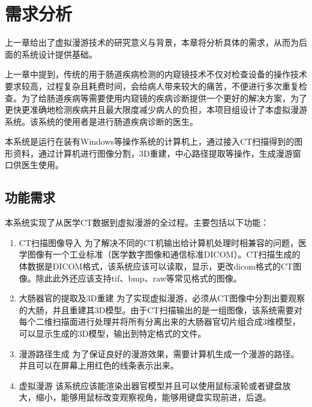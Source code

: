 \chapter{需求分析}
上一章给出了虚拟漫游技术的研究意义与背景，本章将分析具体的需求，从而为后面的系统设计提供基础。

上一章中提到，传统的用于肠道疾病检测的内窥镜技术不仅对检查设备的操作技术要求较高，过程复杂且耗费时间，会给病人带来较大的痛苦，不便进行多次重复检查。为了给肠道疾病等需要使用内窥镜的疾病诊断提供一个更好的解决方案，为了更快更准确地检测疾病并且最大限度减少病人的负担，本项目组设计了本虚拟漫游系统。该系统的使用者是进行肠道疾病诊断的医生。

本系统是运行在装有Windows等操作系统的计算机上，通过接入CT扫描得到的图形资料，通过计算机进行图像分割，3D重建，中心路径提取等操作，生成漫游窗口供医生使用。
\section{功能需求}
本系统实现了从医学CT数据到虚拟漫游的全过程。主要包括以下功能：
\begin{enumerate}
    \item CT扫描图像导入
为了解决不同的CT机输出给计算机处理时相兼容的问题，医学图像有一个工业标准（医学数字图像和通信标准DICOM）。CT扫描生成的体数据是DICOM格式，该系统应该可以读取，显示，更改dicom格式的CT图像。除此此外还应该支持tif、bmp、raw等常见格式的图像。
    \item 大肠器官的提取及3D重建
为了实现虚拟漫游，必须从CT图像中分割出要观察的大肠，并且重建其3D模型。由于CT扫描输出的是一组图像，该系统需要对每个二维扫描面进行处理并将所有分离出来的大肠器官切片组合成3维模型，可以显示生成的3D模型，输出到特定格式的文件。
    \item 漫游路径生成
为了保证良好的漫游效果，需要计算机生成一个漫游的路径。并且可以在屏幕上用红色的线条表示出来。
    \item 虚拟漫游
该系统应该能渲染出器官模型并且可以使用鼠标滚轮或者键盘放大，缩小，能够用鼠标改变观察视角，能够用键盘实现前进，后退。
\end{enumerate}

